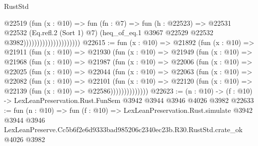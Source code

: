 \begin{lexlean}{RustStd}
\begin{coremodule}
                                        @22519
                                          (fun (x : @10) =>
                                          fun (fn : @7) =>
                                          fun (h : @22523) =>
                                          @22531
                                            @22532
                                            (Eq.refl.{2} (Sort 1) @7)
                                            (heq_of_eq.{1}
                                              @3967
                                              @22529
                                              @22532
                                              @3982)))))))))))))))))))))
@22615 := fun (x : @10) =>
  @21892
    (fun (x : @10) =>
    @21911
      (fun (x : @10) =>
      @21930
        (fun (x : @10) =>
        @21949
          (fun (x : @10) =>
          @21968
            (fun (x : @10) =>
            @21987
              (fun (x : @10) =>
              @22006
                (fun (x : @10) =>
                @22025
                  (fun (x : @10) =>
                  @22044
                    (fun (x : @10) =>
                    @22063
                      (fun (x : @10) =>
                      @22082
                        (fun (x : @10) =>
                        @22101
                          (fun (x : @10) =>
                          @22120 (fun (x : @10) => @22139 (fun (x : @10) => @22586))))))))))))))
@22623 := (n : @10) -> (f : @10) -> LexLeanPreservation.Rust.FunSem @3942 @3944 @3946 @4026 @3982
@22633 := fun (n : @10) =>
  fun (f : @10) =>
  LexLeanPreservation.Rust.simulate
    @3942
    @3944
    @3946
    LexLeanPreserve.Cc5b6f2e6d9333bad985206c2340ec23b.R30.RustStd.crate_ok
    @4026
    @3982
\end{coremodule}
\end{lexlean}
